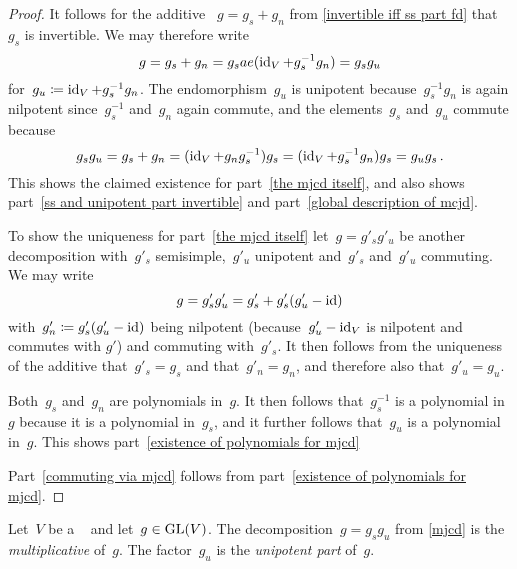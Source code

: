 \begin{proof}
  It follows for the additive {\JCD}~$g = g_s + g_n$ from \cref{invertible iff ss part fd} that~$g_s$ is invertible.
  We may therefore write
  \[
      g
    = g_s + g_n
    = g_s ae(\operatorname{id}_V + g_s^{-1} g_n)
    = g_s g_u
  \]
  for~$g_u \coloneqq \operatorname{id}_V + g_s^{-1} g_n$.
  The endomorphism~$g_u$ is unipotent because~$g_s^{-1} g_n$ is again nilpotent since~$g_s^{-1}$ and~$g_n$ again commute, and the elements~$g_s$ and~$g_u$ commute because
  \[
      g_s g_u
    = g_s + g_n
    = (\operatorname{id}_V + g_n g_s^{-1}) g_s
    = (\operatorname{id}_V + g_s^{-1} g_n) g_s
    = g_u g_s \,.
  \]
  This shows the claimed existence for part~\ref*{the mjcd itself}, and also shows part~\ref*{ss and unipotent part invertible} and part~\ref*{global description of mcjd}.
  
  To show the uniqueness for part~\ref*{the mjcd itself} let~$g = g'_s g'_u$ be another decomposition with~$g'_s$ semisimple,~$g'_u$ unipotent and~$g'_s$ and~$g'_u$ commuting.
  We may write
  \[
      g
    = g'_s g'_u
    = g'_s + g'_s (g'_u - \operatorname{id})
  \]
  with~$g'_n \coloneqq g'_s (g'_u - \operatorname{id})$ being nilpotent (because~$g'_u - \operatorname{id}_V$ is nilpotent and commutes with $g'$) and commuting with~$g'_s$.
  It then follows from the uniqueness of the additive {\JCD} that~$g'_s = g_s$ and that~$g'_n = g_n$, and therefore also that~$g'_u = g_u$.
  
  Both~$g_s$ and~$g_n$ are polynomials in~$g$.
  It then follows that~$g_s^{-1}$ is a polynomial in~$g$ because it is a polynomial in~$g_s$, and it further follows that~$g_u$ is a polynomial in~$g$.
  This shows part~\ref*{existence of polynomials for mjcd}
  
  Part~\ref*{commuting via mjcd} follows from part~\ref*{existence of polynomials for mjcd}.
\end{proof}


\begin{definition}
  \label{mjcd definition}
  Let~$V$ be a {\fd}~{\kvs} and let~$g \in \operatorname{GL}(V)$.
  The decomposition~$g = g_s g_u$ from \cref{mjcd} is the \emph{multiplicative {\JCD}} of~$g$.
  The factor~$g_u$ is the \emph{unipotent part} of~$g$.
\end{definition}


